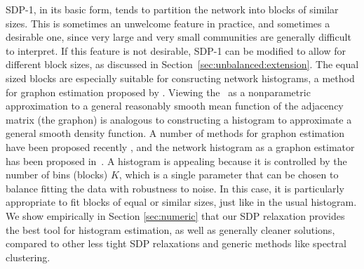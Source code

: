 SDP-1, in its basic form, tends to partition the network into blocks of similar sizes.  This is sometimes an unwelcome feature in practice, and sometimes a desirable one, since very large and very small communities are generally difficult to interpret.    If this feature is not desirable, SDP-1 can be modified to allow for different block sizes, as discussed in Section~\ref{sec:unbalanced:extension}.    The equal sized blocks are especially suitable for consructing network histograms, a method for graphon estimation proposed by \cite{Olhede2013}.  Viewing the \SBM\ as a nonparametric approximation to a general reasonably smooth mean function of the adjacency matrix (the graphon) is analogous to constructing a histogram to approximate a general smooth density function.  A number of methods for graphon estimation have been proposed recently \cite{Airoldi.et.al.2013,Wolfe2013,Zhang2015}, and the network histogram as a graphon estimator has been proposed in~\cite{Olhede2013}.   
% 
A histogram is appealing because it is controlled by the number of bins (blocks) $K$, which is a single parameter that can be chosen to balance fitting the data with robustness to noise. In this case, it is particularly appropriate to fit blocks of equal or similar sizes, just like in the usual histogram.   
%
We show empirically in Section \ref{sec:numeric} that our SDP relaxation provides the best tool for histogram estimation, as well as  generally cleaner solutions, compared to other less tight SDP relaxations and generic methods like spectral clustering.  


    
